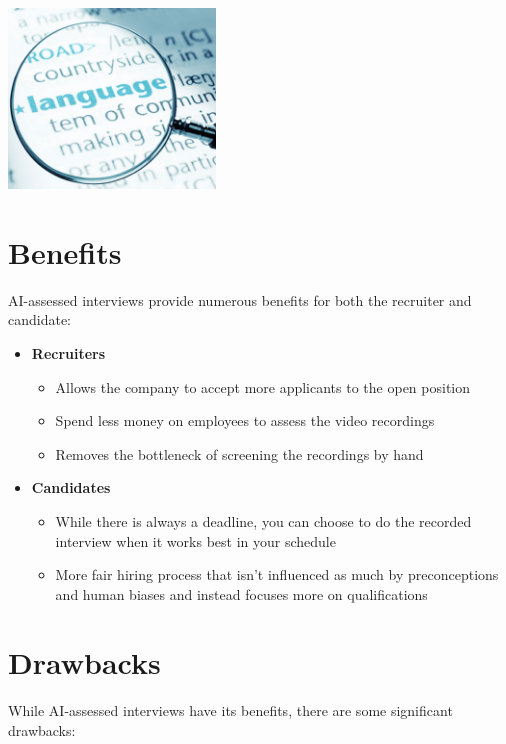 \documentclass[
]{book}
\begin{document}
\includegraphics[width=2.16667in,height=\textheight]{Language_Analysis.png}

\hypertarget{benefits-1}{%
\section{Benefits}\label{benefits-1}}

AI-assessed interviews provide numerous benefits for both the recruiter and candidate:

\begin{itemize}
\item
  \textbf{Recruiters}

  \begin{itemize}
  \item
    Allows the company to accept more applicants to the open position~
  \item
    Spend less money on employees to assess the video recordings
  \item
    Removes the bottleneck of screening the recordings by hand
  \end{itemize}
\item
  \textbf{Candidates}

  \begin{itemize}
  \item
    While there is always a deadline, you can choose to do the recorded interview when it works best in your schedule
  \item
    More fair hiring process that isn't influenced as much by preconceptions and human biases and instead focuses more on qualifications
  \end{itemize}
\end{itemize}

\hypertarget{drawbacks}{%
\section{Drawbacks}\label{drawbacks}}

While AI-assessed interviews have its benefits, there are some significant drawbacks:
\end{document}
